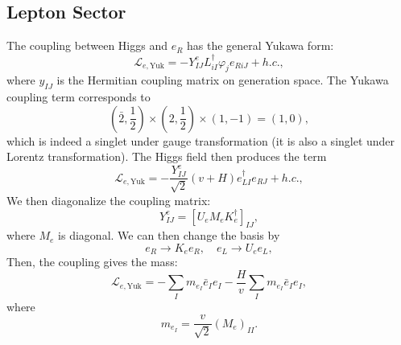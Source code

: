 \documentclass[aps,rmp,twocolumn,superscriptaddress,nofootinbib]{revtex4-2}
\begin{document}
\subsection{Lepton Sector}
The coupling between Higgs and $e_R$ has the general Yukawa form:
\begin{equation}
	\mathcal L_{e,\mathrm{Yuk}} = -Y^e_{IJ} L_{iI}^\dagger \varphi_j e_{R iJ} + h.c.,
\end{equation}
where $y_{IJ}$ is the Hermitian coupling matrix on generation space.
The Yukawa coupling term corresponds to
\begin{equation*}
	\left(\bar 2, \frac{1}{2}\right) \times \left(2, \frac{1}{2}\right) \times \left(1, -1\right) = \left(1,0\right),
\end{equation*}
which is indeed a singlet under gauge transformation (it is also a singlet under Lorentz transformation).
The Higgs field then produces the term
\begin{equation}
	\mathcal L_{e,\mathrm{Yuk}} = -\frac{Y^e_{IJ}}{\sqrt 2}(v+H) e_{LI}^\dagger e_{RJ} + h.c.,
\end{equation}
We then diagonalize the coupling matrix:
\begin{equation}
	 Y^e_{IJ} = \left[U_{e} M_e K^\dagger_{e}\right]_{IJ},
\end{equation}
where $M_e$ is diagonal.
We can then change the basis by
\begin{equation}
	e_R \rightarrow K_e e_R, \quad
	e_L \rightarrow U_e e_L,
\end{equation}
Then, the coupling gives the mass:
\begin{equation}
	\mathcal L_{e,\mathrm{Yuk}} 
	= - \sum_I m_{e_I} \bar e_I e_I - \frac{H}{v}\sum_I m_{e_I} \bar e_I e_I,
\end{equation}
where
\begin{equation}
	m_{e_I} = \frac{v}{\sqrt 2} (M_e)_{II}.
\end{equation}
\end{document}
